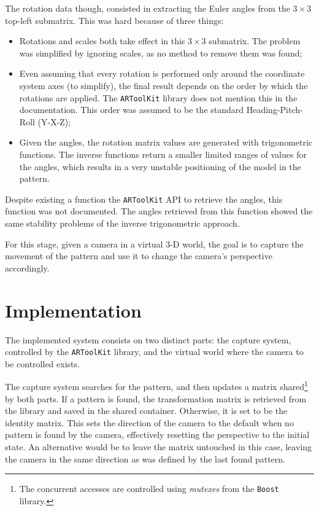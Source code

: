 \documentclass{acmtog}
\begin{document}
The rotation data though, consisted in extracting the Euler angles from the $3 \times 3$ top-left submatrix. This was hard because of three things:
\begin{itemize}
\item{Rotations and scales both take effect in this $3 \times 3$ submatrix. The problem was simplified by ignoring scales, as no method to remove them was found;}
\item{Even assuming that every rotation is performed only around the coordinate system axes (to simplify), the final result depends on the order by which the rotations are applied. The \texttt{ARToolKit} library does not mention this in the documentation. This order was assumed to be the standard Heading-Pitch-Roll (Y-X-Z);}
\item{Given the angles, the rotation matrix values are generated with trigonometric functions. The inverse functions return a smaller limited ranges of values for the angles, which results in a very unstable positioning of the model in the pattern.}
\end{itemize}
Despite existing a function the \texttt{ARToolKit} API to retrieve the angles, this function was not documented. The angles retrieved from this function showed the same stability problems of the inverse trigonometric approach.

For this stage, given a camera in a virtual 3-D world, the goal is to capture the movement of the pattern and use it to change the camera's perspective accordingly.

\section{Implementation}
The implemented system consists on two distinct parts: the capture system, controlled by the \texttt{ARToolKit} library, and the virtual world where the camera to be controlled exists.

The capture system searches for the pattern, and then updates a matrix shared\footnote{The concurrent accesses are controlled using \textit{mutexes} from the \texttt{Boost} library.} by both parts. If a pattern is found, the transformation matrix is retrieved from the library and saved in the shared container. Otherwise, it is set to be the identity matrix. This sets the direction of the camera to the default when no pattern is found by the camera, effectively resetting the perspective to the initial state. An alternative would be to leave the matrix untouched in this case, leaving the camera in the same direction as was defined by the last found  pattern.
\end{document}
